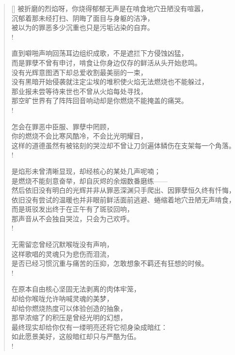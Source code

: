 \documentclass[UTF8, 12pt, a4paper]{ctexrep} %
\begin{document}
\begin{verse}[\versewidth]
被折磨的烈焰呀，你烧得郁郁无声是在啃食地穴丑陋没有喧嚣，\\
沉郁着那未经打扫、阴晦了面目与身躯的洁净，\\
被以为的罪恶多少沉重也只是污垢沾染的自弃。\\!

直到噼啪声响回荡耳边组织成歌，不是遮拦下方侵蚀凶猛，\\
而是罪孽不曾有申讨，啃食让你身边仅存的鲜活从头开始悲鸣。\\
没有光辉意图洒下却总爱收割最美丽的一束，\\
没有黑暗开始侵袭就注定尘埃的堆积使火焰无法燃烧也不能躲过，\\
那业报未尝等待来世也不曾从火焰每处寻找，\\
那空旷世界有了阵阵回音响动却是你燃烧不能掩盖的痛哭。\\!

怎会在罪恶中臣服、罪孽中罔顾，\\
你的燃烧不会比寒风酷冷，不会比光明耀目，\\
这样的道德虽然有被铭刻的哭泣却不曾让刀剑遍体鳞伤在支架每一个角落。\\!

是焰形未曾清晰显现，却经核心的某处几声呢喃；\\
是燃烧不能刻意奋举，却自灰烬的余烟数番磨练——\\
然后依旧没有明白的光辉并非从罪恶深渊只手爬出、因罪孽恒久终有忏悔，\\
依旧没有尝试的温暖也并非眼前鲜活面前逃避、蜷缩着地穴丑陋无声啃食，\\
而是斑驳发出终于在正午有了斑驳回响，\\
那声音从不会独自哭泣，只会为己欢呼。\\!

无需留恋曾经沉默喉咙没有声响，\\
这样歌唱的灵魂只为悲伤而泪流，\\
是否已经习惯沉重与痛苦的压抑，怎敢想象不羁还有狂想的时候。\\!

在原本自由核心坚固无法剥离的肉体牢笼，\\
却给你喉咙允许呐喊灵魂的美梦，\\
却给你燃烧热度可以体验创造的抽象，\\
那早浓缩了的积压是曾经光明的幻想，\\
最终现实却给你仅有一缕明亮还将它彻身染成暗红：\\
如此愿景美好，这般暗红却只与严酷为伍。\\!


\end{verse}
\end{document}
